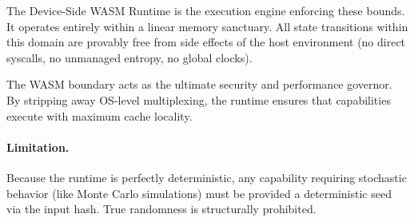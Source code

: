 The Device-Side WASM Runtime is the execution engine enforcing these bounds. It operates entirely within a linear memory sanctuary. All state transitions within this domain are provably free from side effects of the host environment (no direct syscalls, no unmanaged entropy, no global clocks).

The WASM boundary acts as the ultimate security and performance governor. By stripping away OS-level multiplexing, the runtime ensures that capabilities execute with maximum cache locality.

\paragraph{Limitation.}
Because the runtime is perfectly deterministic, any capability requiring stochastic behavior (like Monte Carlo simulations) must be provided a deterministic seed via the input hash. True randomness is structurally prohibited.
